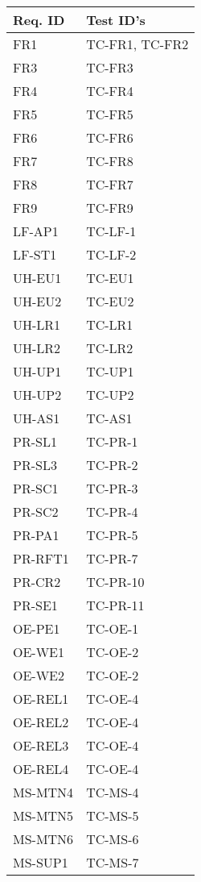 \documentclass[12pt, titlepage]{article}
\begin{document}
\begin{longtable}{|l|l|}
  \hline
  \textbf{Req. ID} & \textbf{Test ID's} \\
  \hline
  FR1 & TC-FR1, TC-FR2\\ \hline
  FR3 & TC-FR3\\ \hline
  FR4 & TC-FR4\\ \hline
  FR5 & TC-FR5\\ \hline
  FR6 & TC-FR6\\ \hline
  FR7 & TC-FR8\\ \hline
  FR8 & TC-FR7\\ \hline
  FR9 & TC-FR9\\ \hline
  LF-AP1 & TC-LF-1 \\ \hline
  LF-ST1 & TC-LF-2 \\ \hline
  UH-EU1 & TC-EU1\\ \hline
  UH-EU2 & TC-EU2\\ \hline
  UH-LR1 & TC-LR1\\ \hline
  UH-LR2 & TC-LR2\\ \hline
  UH-UP1 & TC-UP1\\ \hline
  UH-UP2 & TC-UP2\\ \hline
  UH-AS1 & TC-AS1\\ \hline
  PR-SL1 & TC-PR-1\\ \hline
  PR-SL3 & TC-PR-2\\ \hline
  PR-SC1 & TC-PR-3\\ \hline
  PR-SC2 & TC-PR-4\\ \hline
  PR-PA1 & TC-PR-5\\ \hline
  PR-RFT1 & TC-PR-7\\ \hline
  PR-CR2 & TC-PR-10\\ \hline
  PR-SE1 & TC-PR-11\\ \hline
  OE-PE1 & TC-OE-1 \\ \hline
  OE-WE1 & TC-OE-2 \\ \hline
  OE-WE2 & TC-OE-2 \\ \hline
  OE-REL1 & TC-OE-4 \\ \hline
  OE-REL2 & TC-OE-4 \\ \hline
  OE-REL3 & TC-OE-4 \\ \hline
  OE-REL4 & TC-OE-4 \\ \hline
  MS-MTN4 & TC-MS-4 \\ \hline
  MS-MTN5 & TC-MS-5 \\ \hline
  MS-MTN6 & TC-MS-6 \\ \hline
  MS-SUP1 & TC-MS-7 \\ \hline

\end{longtable}
\end{document}
